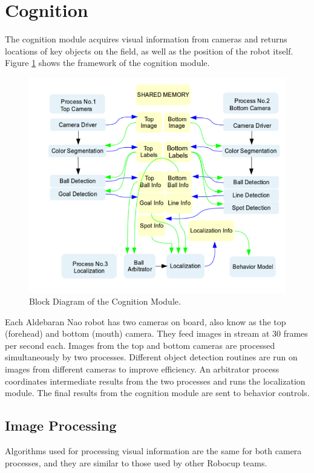 \documentclass{article}
\begin{document}
\section{Cognition}
	The cognition module acquires visual information from cameras and returns locations of key objects on the field, as well as the position of the robot itself. Figure \ref{fig:cog} shows the framework of the cognition module. 

	\begin{figure}[H]
		\centering
		\includegraphics[width=1.0\textwidth]{figures/CogStructure.png}
		\caption{Block Diagram of the Cognition Module.}
  		\label{fig:cog}
	\end{figure}

	Each Aldebaran Nao robot has two cameras on board, also know as the top (forehead) and bottom (mouth) camera. They feed images in stream at 30 frames per second each. Images from the top and bottom cameras are processed simultaneously by two processes. Different object detection routines are run on images from different cameras to improve efficiency. An arbitrator process coordinates intermediate results from the two processes and runs the localization module. The final results from the cognition module are sent to behavior controls.

\subsection{Image Processing}
	Algorithms used for processing visual information are the same for both camera processes, and they are similar to those used by other Robocup teams. 
\end{document}
